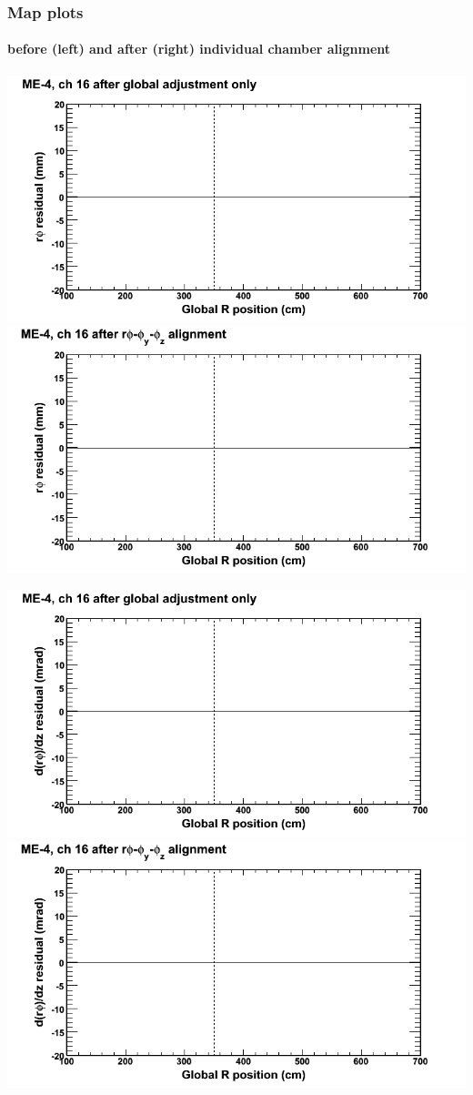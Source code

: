 \documentclass[compress]{beamer}
\begin{document}
\begin{frame}
\frametitle{Map plots}
\framesubtitle{before (left) and after (right) individual chamber alignment}
\includegraphics[width=0.5\linewidth]{ringmapplots_3dof/before_CSCvsr_mem4ch16_x.png} \includegraphics[width=0.5\linewidth]{ringmapplots_3dof/after_CSCvsr_mem4ch16_x.png}

\includegraphics[width=0.5\linewidth]{ringmapplots_3dof/before_CSCvsr_mem4ch16_dxdz.png} \includegraphics[width=0.5\linewidth]{ringmapplots_3dof/after_CSCvsr_mem4ch16_dxdz.png}
\end{frame}
\end{document}
